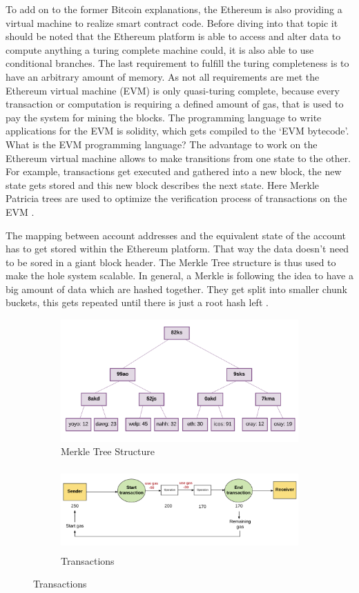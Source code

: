 To add on to the former Bitcoin explanations, the Ethereum is also providing a virtual machine to realize smart contract code. 
Before diving into that topic it should be noted that the Ethereum platform is able to access and alter data to compute anything a turing complete machine could, it is also able to use conditional branches. 
The last requirement to fulfill the turing completeness is to have an arbitrary amount of memory. 
As not all requirements are met the Ethereum virtual machine (EVM) is only quasi-turing complete, because every transaction or computation is requiring a defined amount of gas, that is used to pay the system for mining the blocks. 
The programming language to write applications for the EVM is solidity, which gets compiled to the ‘EVM bytecode’. 
What is the EVM programming language?
The advantage to work on the Ethereum virtual machine allows to make transitions from one state to the other. For example, transactions get executed and gathered into a new block, the new state gets stored and this new block describes the next state.
Here Merkle Patricia trees are used to optimize the verification process of transactions on the EVM \cite{Bisade2018}.

The mapping between account addresses and the equivalent state of the account has to get stored within the Ethereum platform. That way the data doesn’t need to be sored in a giant block header.
The Merkle Tree structure is thus used to make the hole system scalable. 
In general, a Merkle is following the idea to have a big amount of data which are hashed together. 
They get split into smaller chunk buckets, this gets repeated until there is just a root hash left \cite{Buterin2015}.

\begin{figure}
  \begin{subfigure}{0.5\textwidth}
    \centering
    \includegraphics[width=0.9\linewidth]{MerkleTree1.png}
    \caption{Merkle Tree Structure}
  \end{subfigure}%
  \begin{subfigure}{0.5\textwidth}
    \centering
    \includegraphics[width=0.7\linewidth, height=120px]{gastransactions.png}
  \caption{Transactions} 
  \end{subfigure}
\end{figure}

